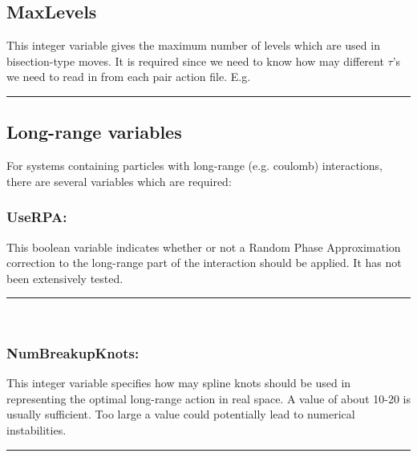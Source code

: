 \documentclass{book}
\begin{document}
\subsection{MaxLevels}
This integer variable gives the maximum number of levels which are
used in bisection-type moves.  It is required since we need to know
how may different $\tau$'s we need to read in from each pair action
file.  E.g.\\
\rule{0.6cm}{0cm}
\subsection{Long-range variables}
For systems containing particles with long-range (e.g. coulomb)
interactions, there are several variables which are required:
\subsubsection{UseRPA:}
   This boolean variable indicates whether or not a Random Phase
 Approximation correction to the long-range part of the interaction
 should be applied.  It has not been extensively tested.\\
\rule{0.6cm}{0cm}\\
\subsubsection{NumBreakupKnots:}
This integer variable specifies how may spline knots should be used in
representing the optimal long-range action in real space.  A value of
about 10-20 is usually sufficient.  Too large a value could
potentially lead to numerical instabilities.\\
\rule{0.0cm}{0.75cm}\rule{0.6cm}{0cm}\\
\end{document}
